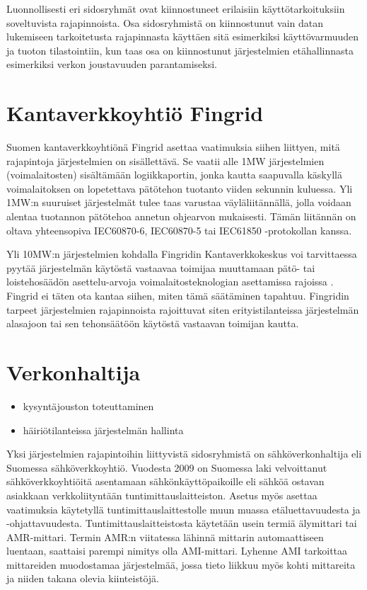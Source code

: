 Luonnollisesti eri sidosryhmät ovat kiinnostuneet erilaisiin käyttötarkoituksiin soveltuvista rajapinnoista. Osa sidosryhmistä on kiinnostunut vain datan lukemiseen tarkoitetusta rajapinnasta käyttäen sitä esimerkiksi käyttövarmuuden ja tuoton tilastointiin, kun taas osa on kiinnostunut järjestelmien etähallinnasta esimerkiksi verkon joustavuuden parantamiseksi.

\section{Kantaverkkoyhtiö Fingrid}
  Suomen kantaverkkoyhtiönä Fingrid asettaa vaatimuksia siihen liittyen, mitä rajapintoja järjestelmien on sisällettävä. Se vaatii alle 1MW järjestelmien (voimalaitosten) sisältämään logiikkaportin, jonka kautta saapuvalla käskyllä voimalaitoksen on lopetettava pätötehon tuotanto viiden sekunnin kuluessa. Yli 1MW:n suuruiset järjestelmät tulee taas varustaa väyläliitännällä, jolla voidaan alentaa tuotannon pätötehoa annetun ohjearvon mukaisesti. Tämän liitännän on oltava yhteensopiva IEC60870-6, IEC60870-5 tai IEC61850 -protokollan kanssa. \parencite{VJV2018}
  
  Yli 10MW:n järjestelmien kohdalla Fingridin Kantaverkkokeskus voi tarvittaessa pyytää järjestelmän käytöstä vastaavaa toimijaa muuttamaan pätö- tai loistehosäädön asettelu-arvoja voimalaitosteknologian asettamissa rajoissa \parencite{VJV2018}. Fingrid ei täten ota kantaa siihen, miten tämä säätäminen tapahtuu. Fingridin tarpeet järjestelmien rajapinnoista rajoittuvat siten erityistilanteissa järjestelmän alasajoon tai sen tehonsäätöön käytöstä vastaavan toimijan kautta.

\section{Verkonhaltija}
  \begin{itemize}
    \item kysyntäjouston toteuttaminen
    \item häiriötilanteissa järjestelmän hallinta
  \end{itemize}

  Yksi järjestelmien rajapintoihin liittyvistä sidosryhmistä on sähköverkonhaltija eli Suomessa sähköverkkoyhtiö. Vuodesta 2009 on Suomessa laki velvoittanut sähköverkkoyhtiöitä asentamaan sähkönkäyttöpaikoille eli sähköä ostavan asiakkaan verkkoliityntään tuntimittauslaitteiston. Asetus myös asettaa vaatimuksia käytetyllä tuntimittauslaittestolle muun muassa etäluettavuudesta ja -ohjattavuudesta.\parencite{mittariAsetus} Tuntimittauslaitteistosta käytetään usein termiä älymittari tai AMR-mittari. Termin AMR:n viitatessa lähinnä mittarin automaattiseen luentaan, saattaisi parempi nimitys olla AMI-mittari. Lyhenne AMI tarkoittaa mittareiden muodostamaa järjestelmää, jossa tieto liikkuu myös kohti mittareita ja niiden takana olevia kiinteistöjä.\parencite{dictOfEnergy}

